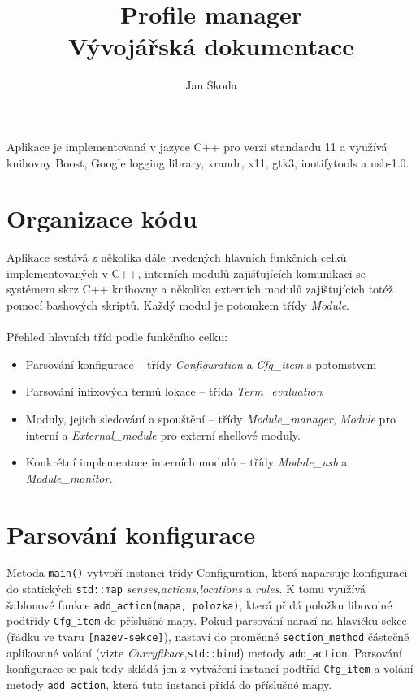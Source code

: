 \documentclass[10pt,a4paper]{article}
\author{Jan Škoda}
\title{Profile manager \\ Vývojářská dokumentace}
\begin{document}
\maketitle
\pagestyle{empty}


Aplikace je implementovaná v jazyce C++ pro verzi standardu 11 a využívá knihovny Boost, Google logging library, xrandr, x11, gtk3, inotifytools a usb-1.0. 

\section*{Organizace kódu}
Aplikace sestává z několika dále uvedených hlavních funkčních celků implementovaných v C++, interních modulů zajišťujících komunikaci se systémem skrz C++ knihovny a několika externích modulů zajišťujících totéž pomocí bashových skriptů. Každý modul je potomkem třídy {\it Module}. \\
\\
Přehled hlavních tříd podle funkčního celku:
\begin{itemize}
    \item Parsování konfigurace -- třídy {\it Configuration} a {\it Cfg\_item} s potomstvem
    \item Parsování infixových termů lokace -- třída {\it Term\_evaluation}
    \item Moduly, jejich sledování a spouštění -- třídy {\it Module\_manager}, {\it Module} pro interní a {\it External\_module} pro externí shellové moduly.
    \item Konkrétní implementace interních modulů -- třídy {\it Module\_usb} a {\it Module\_monitor}.
\end{itemize}

\section*{Parsování konfigurace}
Metoda \texttt{main()} vytvoří instanci třídy Configuration, která naparsuje konfiguraci do statických \texttt{std::map} {\it senses,actions,locations} a {\it rules}. K tomu využívá šablonové funkce \texttt{add\_action(mapa, polozka)}, která přidá položku libovolné podtřídy \texttt{Cfg\_item} do příslušné mapy. Pokud parsování narazí na hlavičku sekce (řádku ve tvaru \texttt{[nazev-sekce]}), nastaví do proměnné \texttt{section\_method} částečně aplikované volání (vizte {\it Curryfikace},\texttt{std::bind}) metody \texttt{add\_action}. Parsování konfigurace se pak tedy skládá jen z vytváření instancí podtříd \texttt{Cfg\_item} a volání metody \texttt{add\_action}, která tuto instanci přidá do příslušné mapy. \\
\end{document}
